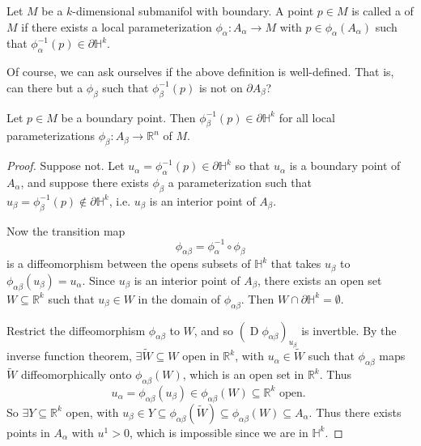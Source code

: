 \documentclass[notoc,notitlepage]{tufte-book}
\DeclareMathOperator{\D}{D}
\begin{document}
\begin{defn}\label{defn:boundary_point_on_a_submanifold}
  Let $M$ be a $k$-dimensional submanifol with boundary. A point $p \in M$ is
  called a  of $M$ if there exists a local
  parameterization $\phi_\alpha : A_\alpha \to M$ with $p \in
  \phi_\alpha(A_\alpha)$ such that $\phi_\alpha^{-1} (p) \in \partial
  \mathbb{H}^k$.
\end{defn}

Of course, we can ask ourselves if the above definition is well-defined. That
is, can there but a $\phi_\beta$ such that $\phi_\beta^{-1}(p)$ is not on
$\partial A_\beta$?

\begin{propo}\label{propo:well_definedness_of_the_boundary_of_a_manifold}
  Let $p \in M$ be a boundary point. Then $\phi_\beta^{-1}(p) \in \partial
  \mathbb{H}^k$ for all local parameterizations $\phi_\beta : A_\beta \to
  \mathbb{R}^n$ of  $M$.
\end{propo}

\begin{proof}
  Suppose not. Let $u_\alpha = \phi_\alpha^{-1}(p) \in \partial \mathbb{H}^k$ so
  that $u_\alpha$ is a boundary point of $A_\alpha$, and suppose there exists
  $\phi_\beta$ a parameterization such that $u_\beta = \phi_\beta^{-1}(p) \notin
  \partial \mathbb{H}^k$, i.e. $u_\beta$ is an interior point of $A_\beta$.

  Now the transition map
  \begin{equation*}
    \phi_{\alpha\beta} = \phi_\alpha^{-1} \circ \phi_\beta
  \end{equation*}
  is a diffeomorphism between the opens subsets of $\mathbb{H}^k$ that takes
  $u_\beta$ to $\phi_{\alpha\beta}(u_\beta) = u_\alpha$. Since $u_\beta$ is an
  interior point of $A_\beta$, there exists an open set $W \subseteq
  \mathbb{R}^k$ such that $u_\beta \in W$ in the domain of $\phi_{\alpha\beta}$.
  Then $W \cap \partial \mathbb{H}^k = \emptyset$.

  Restrict the diffeomorphism $\phi_{\alpha\beta}$ to $W$, and so $(\D
  \phi_{\alpha\beta})_{u_\beta}$ is invertble. By the inverse function theorem,
  $\exists \tilde{W} \subseteq W$ open in $\mathbb{R}^k$, with $u_\alpha \in
  \tilde{W}$ such that $\phi_{\alpha\beta}$ maps $\tilde{W}$ diffeomorphically
  onto $\phi_{\alpha\beta}(W)$, which is an open set in $\mathbb{R}^k$. Thus
  \begin{equation*}
    u_\alpha = \phi_{\alpha\beta}(u_\beta) \in \phi_{\alpha\beta} (W) \subseteq
    \mathbb{R}^k \text{ open. }
  \end{equation*}
  So $\exists Y \subseteq \mathbb{R}^k$ open, with $u_\beta \in Y \subseteq
  \phi_{\alpha\beta}(\tilde{W}) \subseteq \phi_{\alpha\beta}(W) \subseteq
  A_{\alpha}$. Thus there exists points in $A_\alpha$ with $u^1 > 0$, which is
  impossible since we are in $\mathbb{H}^k$.
\end{proof}
\end{document}
